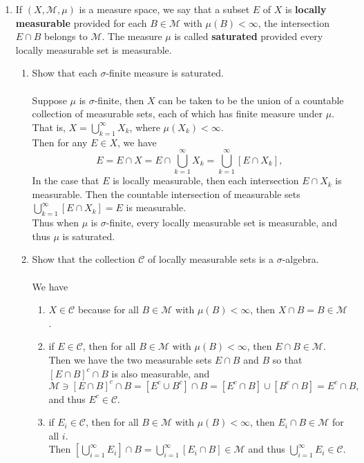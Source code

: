 \begin{enumerate}
	\item If $(X,\mathcal{M},\mu)$ is a measure space, we say that a subset $E$ of $X$ is \textbf{locally measurable} provided for each $B\in\mathcal{M}$ with $\mu(B)<\infty$, the intersection $E\cap B$ belongs to $\mathcal{M}$.
	The measure $\mu$ is called \textbf{saturated} provided every locally measurable set is measurable.
	\begin{enumerate}[label=(\roman*),align=left]  
		\item Show that each $\sigma$-finite measure is saturated.\\
		\\Suppose $\mu$ is $\sigma$-finite, then $X$ can be taken to be the union of a countable collection of measurable sets, each of which has finite measure under $\mu$.
		\\That is, $X=\bigcup_{k=1}^\infty X_k$, where $\mu(X_k)<\infty$.
		\\Then for any $E\in X$, we have 
		\[
			E=E\cap X = E\cap \bigcup_{k=1}^\infty X_k = \bigcup_{k=1}^\infty[E\cap X_k],
		\]
		In the case that $E$ is locally measurable, then each intersection $E\cap X_k$ is measurable.
		Then the countable intersection of measurable sets $\bigcup_{k=1}^\infty[E\cap X_k]=E$ is measurable.
		\\Thus when $\mu$ is $\sigma$-finite, every locally measurable set is measurable, and thus $\mu$ is saturated.
		\item Show that the collection $\mathcal{C}$ of locally measurable sets is a $\sigma$-algebra.\\
		\\We have
		\begin{enumerate}[label=(\roman*),align=left]   
			\item $X\in\mathcal{C}$ because for all $B\in\mathcal{M}$ with $\mu(B)<\infty$, then $X\cap B=B\in\mathcal{M}$.
			\item if $E\in\mathcal{C}$, then for all $B\in\mathcal{M}$ with $\mu(B)<\infty$, then $E\cap B\in\mathcal{M}$.\\
			Then we have the two measurable sets $E\cap B$ and $B$ so that $[E\cap B]^c\cap B$ is also measurable, and
			\[
				\mathcal{M}\ni[E\cap B]^c\cap B=[E^c\cup B^c]\cap B=[E^c\cap B]\cup[B^c\cap B]=E^c\cap B,
			\]
			and thus $E^c\in\mathcal{C}$. 
			\item if $E_i\in\mathcal{C}$, then for all $B\in\mathcal{M}$ with $\mu(B)<\infty$, then $E_i\cap B\in\mathcal{M}$ for all $i$.\\
			Then $\left[\bigcup_{i=1}^\infty E_i\right]\cap B=\bigcup_{i=1}^\infty [E_i\cap B]\in\mathcal{M}$ and thus $\bigcup_{i=1}^\infty E_i\in\mathcal{C}$.

\end{enumerate}
\end{enumerate}
\end{enumerate}
